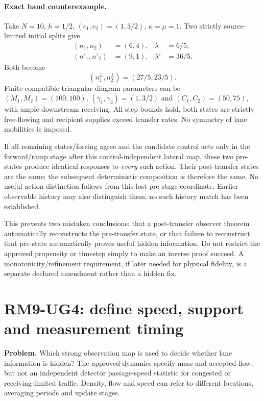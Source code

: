 \documentclass[10pt,a4paper]{article}
\begin{document}
\paragraph{Exact hand counterexample.}
Take $N=10$, $h=1/2$, $(c_1,c_2)=(1,3/2)$, $\kappa=\mu=1$.
Two strictly source-limited initial splits give
\begin{align}
(n_1,n_2)&=(6,4), &\lambda&=6/5,\\
(n'_1,n'_2)&=(9,1), &\lambda'&=36/5.
\end{align}
Both become
\begin{equation}
(n_1^L,n_2^L)=(27/5,23/5).
\end{equation}
Finite compatible triangular-diagram parameters can be
$(M_1,M_2)=(100,100)$, $(\gamma_1,\gamma_2)=(1,3/2)$ and
$(C_1,C_2)=(50,75)$, with ample downstream receiving. All step bounds hold,
both states are strictly free-flowing and recipient supplies exceed transfer
rates. No symmetry of lane mobilities is imposed.

If all remaining states/forcing agree and the candidate control acts only
in the forward/ramp stage after this control-independent lateral map, these
two pre-states produce identical responses to \emph{every} such action.
Their post-transfer states are the same; the subsequent deterministic
composition is therefore the same. No useful action distinction follows
from this lost pre-stage coordinate. Earlier observable history may also
distinguish them; no such history match has been established.

This prevents two mistaken conclusions: that a post-transfer observer theorem
automatically reconstructs the pre-transfer state, or that failure to reconstruct
that pre-state automatically proves useful hidden information.
Do not restrict the approved propensity or timestep simply to make an inverse
proof succeed. A monotonicity/refinement requirement, if later needed for
physical fidelity, is a separate declared amendment rather than a hidden fix.
\newpage

\section{RM9-UG4: define speed, support and measurement timing}
\noindent\textbf{Problem.} Which strong observation map is used to decide
whether lane information is hidden? The approved dynamics specify mass and
accepted flow, but not an independent detector passage-speed statistic for
congested or receiving-limited traffic. Density, flow and speed can refer to
different locations, averaging periods and update stages.
\end{document}
